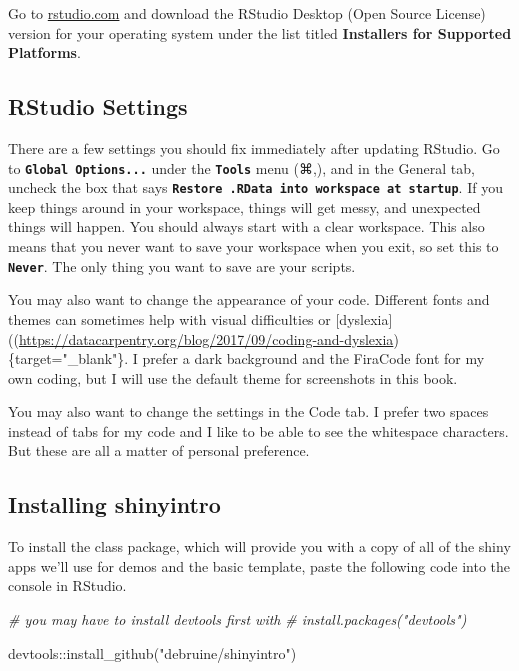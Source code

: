 \documentclass[
  oneside]{book}
\newenvironment{Shaded}{\begin{snugshade}}{\end{snugshade}}
\newcommand{\CommentTok}[1]{\textcolor[rgb]{0.56,0.35,0.01}{\textit{#1}}}
\newcommand{\FunctionTok}[1]{\textcolor[rgb]{0.00,0.00,0.00}{#1}}
\newcommand{\NormalTok}[1]{#1}
\newcommand{\SpecialCharTok}[1]{\textcolor[rgb]{0.00,0.00,0.00}{#1}}
\newcommand{\StringTok}[1]{\textcolor[rgb]{0.31,0.60,0.02}{#1}}
\begin{document}
Go to \href{https://www.rstudio.com/products/rstudio/download/\#download}{rstudio.com} and download the RStudio Desktop (Open Source License) version for your operating system under the list titled \textbf{Installers for Supported Platforms}.

\hypertarget{rstudio-settings}{%
\subsection{RStudio Settings}\label{rstudio-settings}}

There are a few settings you should fix immediately after updating RStudio. Go to \textbf{\texttt{Global\ Options...}} under the \textbf{\texttt{Tools}} menu (⌘,), and in the General tab, uncheck the box that says \textbf{\texttt{Restore\ .RData\ into\ workspace\ at\ startup}}. If you keep things around in your workspace, things will get messy, and unexpected things will happen. You should always start with a clear workspace. This also means that you never want to save your workspace when you exit, so set this to \textbf{\texttt{Never}}. The only thing you want to save are your scripts.

You may also want to change the appearance of your code. Different fonts and themes can sometimes help with visual difficulties or {[}dyslexia{]}((\url{https://datacarpentry.org/blog/2017/09/coding-and-dyslexia})\{target="\_blank"\}. I prefer a dark background and the FiraCode font for my own coding, but I will use the default theme for screenshots in this book.

You may also want to change the settings in the Code tab. I prefer two spaces instead of tabs for my code and I like to be able to see the whitespace characters. But these are all a matter of personal preference.

\hypertarget{installing-shinyintro-1}{%
\subsection{Installing shinyintro}\label{installing-shinyintro-1}}

To install the class package, which will provide you with a copy of all of the shiny apps we'll use for demos and the basic template, paste the following code into the console in RStudio.

\begin{Shaded}
\begin{Highlighting}[]
\CommentTok{\# you may have to install devtools first with }
\CommentTok{\# install.packages("devtools")}

\NormalTok{devtools}\SpecialCharTok{::}\FunctionTok{install\_github}\NormalTok{(}\StringTok{"debruine/shinyintro"}\NormalTok{)}
\end{Highlighting}
\end{Shaded}
\end{document}
